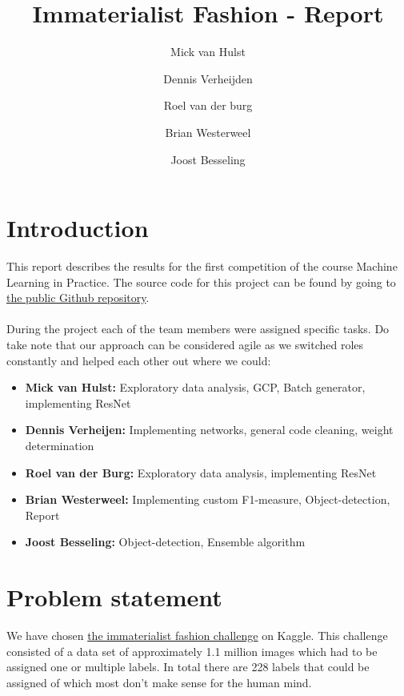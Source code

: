 \documentclass[10pt, a4paper]{article}
\title{Immaterialist Fashion - Report}
\author{Mick van Hulst \and Dennis Verheijden \and Roel van der burg \and Brian Westerweel \and Joost Besseling}
\begin{document}
	\maketitle
	
	
	\begin{multicols}{2}
	
	    \section{Introduction}
	    This report describes the results for the first competition of the course Machine Learning in Practice. The source code for this project can be found by going to \href{https://github.com/mickvanhulst/imaterialist_kaggle}{the public Github repository}.
	    \\
	    \\
	    During the project each of the team members were assigned specific tasks. Do take note that our approach can be considered agile as we switched roles constantly and helped each other out where we could:
	    \begin{itemize}
	        \item \textbf{Mick van Hulst:} Exploratory data analysis, GCP, Batch generator, implementing ResNet
	        \item \textbf{Dennis Verheijen:} Implementing networks, general code cleaning, weight determination
	        \item \textbf{Roel van der Burg:} Exploratory data analysis, implementing ResNet
	        \item \textbf{Brian Westerweel:} Implementing custom F1-measure, Object-detection, Report
	        \item \textbf{Joost Besseling:} Object-detection, Ensemble algorithm
	    \end{itemize}
		
		\section{Problem statement}
		We have chosen \href{https://www.kaggle.com/c/imaterialist-challenge-fashion-2018}{the immaterialist fashion challenge} on Kaggle. This challenge consisted of a data set of approximately 1.1 million images which had to be assigned one or multiple labels. In total there are 228 labels that could be assigned of which most don't make sense for the human mind.
		
		

\end{multicols}
\end{document}
